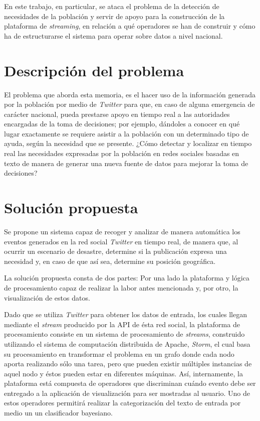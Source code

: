 En este trabajo, en particular, se ataca el problema de la detección de necesidades de la población y servir de apoyo para la construcción de la plataforma de \textit{streaming}, en relación a qué operadores se han de construir y cómo ha de estructurarse el sistema para operar sobre datos a nivel nacional.

\section{Descripción del problema}
\label{intro:problema}

El problema que aborda esta memoria, es el hacer uso de la información generada por la población por medio de \textit{Twitter} para que, en caso de alguna emergencia de carácter nacional, pueda prestarse apoyo en tiempo real a las autoridades encargadas de la toma de decisiones; por ejemplo, dándoles a conocer en qué lugar exactamente se requiere asistir a la población con un determinado tipo de ayuda, según la necesidad que se presente. ¿Cómo detectar y localizar en tiempo real las necesidades expresadas por la población en redes sociales basadas en texto de manera de generar una nueva fuente de datos para mejorar la toma de decisiones?

\section{Solución propuesta}
\label{intro:solucion}

Se propone un sistema capaz de recoger y analizar de manera automática los eventos generados en la red social \textit{Twitter} en tiempo real, de manera que, al ocurrir un escenario de desastre, determine si la publicación expresa una necesidad y, en caso de que así sea, determine su posición geográfica. 

La solución propuesta consta de dos partes: Por una lado la plataforma y lógica de procesamiento capaz de realizar la labor antes mencionada y, por otro, la visualización de estos datos.

Dado que se utiliza \textit{Twitter} para obtener los datos de entrada, los cuales llegan mediante el \textit{stream} producido por la API de ésta red social, la plataforma de procesamiento consiste en un sistema de procesamiento de \textit{streams}, construido utilizando el sistema de computación distribuida de Apache, \textit{Storm}, el cual basa su procesamiento en transformar el problema en un grafo donde cada nodo aporta realizando sólo una tarea, pero que pueden existir múltiples instancias de aquel nodo y éstos pueden estar en diferentes máquinas. Así, internamente, la plataforma está compuesta de operadores que discriminan cuándo evento debe ser entregado a la aplicación de visualización para ser mostradas al usuario. Uno de estos operadores permitirá realizar la categorización del texto de entrada por medio un un clasificador bayesiano.

